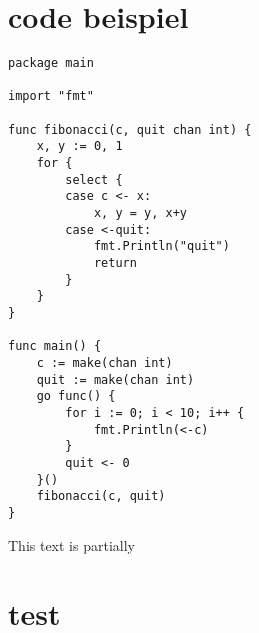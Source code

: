 \section{code beispiel}
\begin{lstlisting}[caption={code beispiel}]
package main

import "fmt"

func fibonacci(c, quit chan int) {
	x, y := 0, 1
	for {
		select {
		case c <- x:
			x, y = y, x+y
		case <-quit:
			fmt.Println("quit")
			return
		}
	}
}

func main() {
	c := make(chan int)
	quit := make(chan int)
	go func() {
		for i := 0; i < 10; i++ {
			fmt.Println(<-c)
		}
		quit <- 0
	}()
	fibonacci(c, quit)
}
\end{lstlisting}
This text is partially 
\blindtext[1]
\section{test}
\blindtext[10]